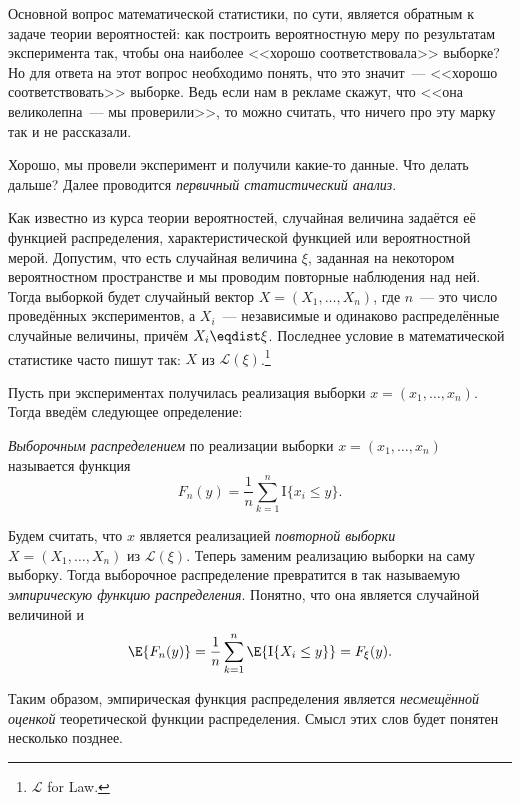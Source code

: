 Основной вопрос математической статистики, по сути, является обратным к задаче 
теории вероятностей: как построить вероятностную меру по результатам 
эксперимента так, чтобы она наиболее <<хорошо соответствовала>> выборке? Но для 
ответа на этот вопрос необходимо понять, что это значит~--- <<хорошо 
соответствовать>> выборке. Ведь если нам в рекламе скажут, что <<она 
великолепна~--- мы проверили>>, то можно считать, что ничего про эту марку так 
и не рассказали.

Хорошо, мы провели эксперимент и получили какие-то данные. Что делать дальше? 
Далее проводится \emph{первичный статистический анализ}. 

Как известно из курса теории вероятностей, случайная величина задаётся её 
функцией распределения, характеристической функцией или вероятностной мерой. 
Допустим, что есть случайная величина \(\xi\), заданная на некотором 
вероятностном пространстве и мы проводим повторные наблюдения над ней. Тогда 
выборкой будет случайный вектор \(X = (X_{1}, \dots, X_{n})\), где \(n\)~--- 
это число проведённых экспериментов, а \(X_{i}\)~--- независимые и одинаково 
распределённые случайные величины, причём \(X_{i} \eqdist \xi\). Последнее 
условие в математической статистике часто пишут так: \(X\) из 
\(\mathcal{L}(\xi)\).\footnote{\(\mathcal{L}\) for Law.}

Пусть при экспериментах получилась реализация выборки \(x = (x_{1}, \dots, 
x_{n})\). Тогда введём следующее определение:

\begin{definition}
	\emph{Выборочным распределением} по реализации выборки \(x = 
	(x_{1}, \dots, x_{n})\) называется функция 
	\[
		F_{n}(y) = \frac{1}{n}\sum_{k = 1}^{n}\mathrm{I}\{x_{i} \leq y\}.
	\]
\end{definition}

Будем считать, что \(x\) является реализацией \emph{повторной выборки} \(X = 
(X_{1}, \dots, X_{n})\) из \(\mathcal{L}(\xi)\). Теперь заменим реализацию 
выборки на саму выборку. Тогда выборочное распределение превратится в так 
называемую \emph{эмпирическую функцию распределения}. Понятно, что она является 
случайной величиной и
\[
	\E{F_{n}(y)} = \frac{1}{n}\sum_{k = 1}^{n}\E{\mathrm{I}\{X_{i} \leq 
	y\}} = F_{\xi}(y).
\]

Таким образом, эмпирическая функция распределения является \emph{несмещённой 
оценкой} теоретической функции распределения. Смысл этих слов будет понятен 
несколько позднее.

